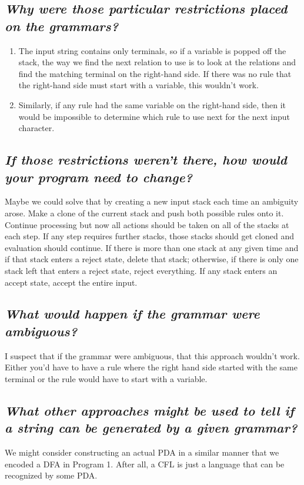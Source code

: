 \documentclass[11pt]{article}
\begin{document}
\subsection[Question 1:]{\emph{Why were those particular restrictions placed on the grammars?}}

\begin{enumerate}
	\item The input string contains only terminals, so if a variable is popped off the stack, the way we find the next relation to use is to look at the relations and find the matching terminal on the right-hand side. If there was no rule that the right-hand side must start with a variable, this wouldn't work.
	\item Similarly, if any rule had the same variable on the right-hand side, then it would be impossible to determine which rule to use next for the next input character.
\end{enumerate}

\subsection[Question 2:]{\emph{If those restrictions weren't there, how would your program need to change?}}
Maybe we could solve that by creating a new input stack each time an ambiguity arose. Make a clone of the current stack and push both possible rules onto it. Continue processing but now all actions should be taken on all of the stacks at each step. If any step requires further stacks, those stacks should get cloned and evaluation should continue. If there is more than one stack at any given time and if that stack enters a reject state, delete that stack; otherwise, if there is only one stack left that enters a reject state, reject everything. If any stack enters an accept state, accept the entire input.

\subsection[Question 3:]{\emph{What would happen if the grammar were ambiguous?}}

I suspect that if the grammar were ambiguous, that this approach wouldn't work. Either you'd have to have a rule where the right hand side started with the same terminal or the rule would have to start with a variable. 

\subsection[Question 4:]{\emph{What other approaches might be used to tell if a string can be generated by a given grammar?}}

We might consider constructing an actual PDA in a similar manner that we encoded a DFA in Program 1. After all, a CFL is just a language that can be recognized by some PDA. 
\end{document}
